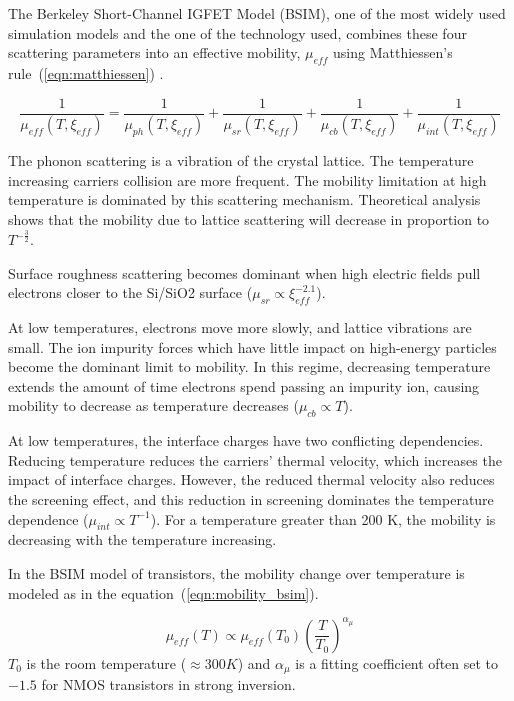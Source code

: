 The Berkeley Short-Channel IGFET Model (BSIM), one of the most widely used simulation models and the one of the technology used, combines these four scattering parameters into an effective mobility, \( \mu_{eff} \) using Matthiessen’s rule~(\ref{eqn:matthiessen}) \cite{Chain1997}.

\begin{equation}
\label{eqn:matthiessen}
\frac{1}{\mu_{eff}(T, \xi_{eff})} = \frac{1}{\mu_{ph}(T, \xi_{eff})} +
\frac{1}{\mu_{sr}(T, \xi_{eff})} + \frac{1}{\mu_{cb}(T, \xi_{eff})} +
\frac{1}{\mu_{int}(T, \xi_{eff})}
\end{equation}

The phonon scattering is a vibration of the crystal lattice. The temperature increasing carriers collision are more frequent. The mobility limitation at high temperature is dominated by this scattering mechanism. Theoretical analysis shows that the mobility due to lattice scattering will decrease in proportion to \(T^{-\frac{3}{2}} \).

Surface roughness scattering becomes dominant when high electric fields pull electrons closer to the Si/SiO2 surface (\(\mu_{sr} \varpropto \xi_{eff}^{-2.1} \))\cite{KLee1991}.

At low temperatures, electrons move more slowly, and lattice vibrations are
small. The ion impurity forces which have little impact on high-energy
particles become the dominant limit to mobility. In this regime, decreasing temperature extends the amount of time electrons spend passing an impurity ion, causing mobility to decrease as temperature decreases (\(\mu_{cb} \varpropto T \)).

At low temperatures, the interface charges have two conflicting dependencies. Reducing temperature reduces the carriers’ thermal velocity, which increases the impact of interface charges. However, the reduced thermal velocity also reduces the screening effect\cite{Jeon1989}, and this reduction in screening dominates the temperature dependence (\(\mu_{int} \varpropto T^{-1} \)). For a temperature greater than 200 K, the mobility is decreasing with the temperature increasing.

In the BSIM model of transistors, the mobility change over temperature is modeled as in the equation~(\ref{eqn:mobility_bsim}).

\begin{equation}
\label{eqn:mobility_bsim}
\mu_{eff}(T) \varpropto \mu_{eff}(T_0) {\left(\frac{T}{T_0} \right)}^{\alpha_\mu}
\end{equation}
\(T_0 \) is the room temperature (\(\approx 300 K \)) and \(\alpha_\mu \) is a fitting coefficient often set to $-1.5$ for NMOS transistors in strong inversion.

